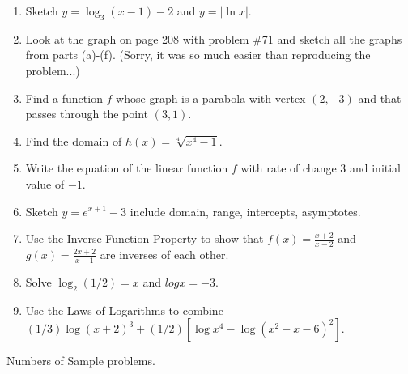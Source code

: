 \documentclass[11pt]{article}
\begin{document}
\begin{enumerate}
\item Sketch $y= \log_3(x-1)-2$ and $y=| \ln x|$.

\item Look at the graph on page 208 with problem \#71 and sketch all the graphs from parts (a)-(f). (Sorry, it was so much easier than reproducing the problem...)

\item Find a function $f$ whose graph is a parabola with vertex $(2,-3)$ and that passes through the point $(3,1).$

\item Find the domain of $h(x) = \sqrt[4]{x^4-1}.$

\item Write the equation of the linear function $f$ with rate of change 3 and initial value of $-1.$

\item Sketch $y=e^{x+1}-3$ include domain, range, intercepts, asymptotes.

\item Use the Inverse Function Property to show that $f(x)=\frac{x+2}{x-2}$ and $g(x)=\frac{2x+2}{x-1}$ are inverses of each other.

\item Solve $ \log_2 (1/2)=x$ and $log x = -3 $.

\item Use the Laws of Logarithms to combine $ (1/3)\log(x+2)^3+(1/2)[\log x^4 - \log (x^2-x-6)^2].$

\end{enumerate}

\newpage

Numbers of Sample problems. \\
\end{document}

